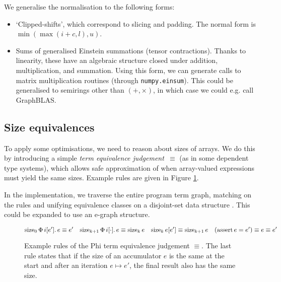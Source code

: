We generalise the normalisation to the following forms: \begin{itemize}
    \item `Clipped-shifts', which correspond to slicing and padding. The normal form is $\min(\max(i + c, l), u)$.
    \item Sums of generalised Einstein summations (tensor contractions). Thanks to linearity, these have an algebraic structure closed under addition, multiplication, and summation. Using this form, we can generate calls to matrix multiplication routines (through \texttt{numpy.einsum}). This could be generalised to semirings other than $(+, \times)$, in which case we could e.g. call GraphBLAS.
\end{itemize}

\subsection{Size equivalences}
\label{size-equiv}

To apply some optimisations, we need to reason about sizes of arrays. We do this by introducing a simple \textit{term equivalence judgement~$\equiv$} (as in some dependent type systems), which allows safe approximation of when array-valued expressions must yield the same sizes. Example rules are given in Figure \ref{fig:term-equivalence}.

In the implementation, we traverse the entire program term graph, matching on the rules and unifying equivalence classes on a disjoint-set data structure \cite{cormen2022introduction}. 
This could be expanded to use an e-graph structure.

\begin{figure}
    \centering
    $$
    \phisize{\phivec{i}{e'}{e}}{0} \equiv e'
    \quad
    \phisize{\phivec{i}{\cdot}{e}}{k+1} \equiv \phisize{e}{k}
    \quad
    \phisize{e[e']}{k} \equiv \phisize{e}{k+1}
    \quad
    (\phiasserteq{e}{e'}) \equiv e \equiv e'
    $$
    \begin{prooftree}
    \end{prooftree}
    \caption{Example rules of the Phi term equivalence judgement $\equiv$. The last rule states that if the size of an accumulator $e$ is the same at the start and after an iteration $e \mapsto e'$, the final result also has the same size.}
    \label{fig:term-equivalence}
\end{figure}

